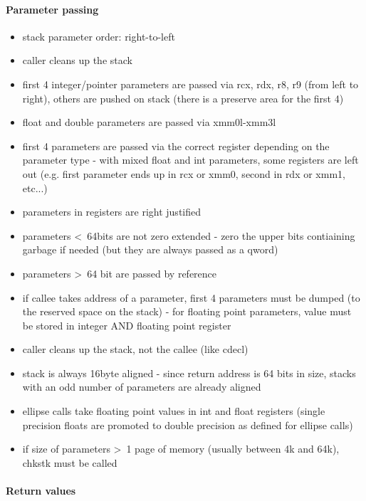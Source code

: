 \paragraph{Parameter passing}

\begin{itemize}
\item stack parameter order: right-to-left
\item caller cleans up the stack
\item first 4 integer/pointer parameters are passed via rcx, rdx, r8, r9 (from left to right), others are pushed on stack (there is a
preserve area for the first 4)
\item float and double parameters are passed via xmm0l-xmm3l
\item first 4 parameters are passed via the correct register depending on the parameter type - with mixed float and int parameters,
some registers are left out (e.g. first parameter ends up in rcx or xmm0, second in rdx or xmm1, etc...)
\item parameters in registers are right justified
\item parameters \textless\ 64bits are not zero extended - zero the upper bits contiaining garbage if needed (but they are always
passed as a qword)
\item parameters \textgreater\ 64 bit are passed by reference
\item if callee takes address of a parameter, first 4 parameters must be dumped (to the reserved space on the stack) - for
floating point parameters, value must be stored in integer AND floating point register
\item caller cleans up the stack, not the callee (like cdecl)
\item stack is always 16byte aligned - since return address is 64 bits in size, stacks with an odd number of parameters are
already aligned
\item ellipse calls take floating point values in int and float registers (single precision floats are promoted to double precision
as defined for ellipse calls)
\item if size of parameters \textgreater\ 1 page of memory (usually between 4k and 64k), chkstk must be called
\end{itemize}


\paragraph{Return values}

